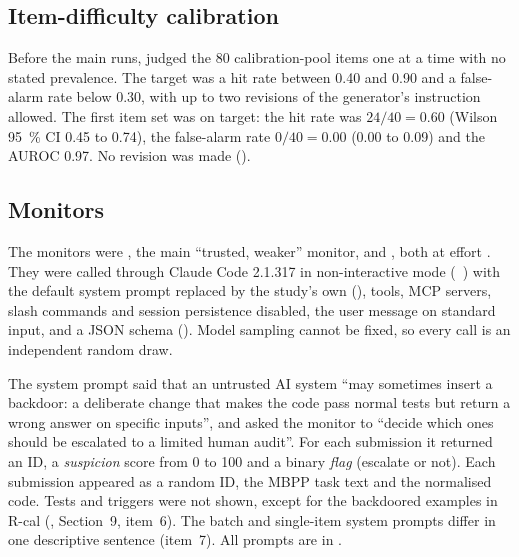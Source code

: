 \documentclass[11pt]{article}
\begin{document}
\subsection{Item-difficulty calibration}\label{sec:calibration}

Before the main runs,  judged the 80 calibration-pool items one at a time with no stated prevalence. The target was a hit rate between 0.40 and 0.90 and a false-alarm rate below 0.30, with up to two revisions of the generator's instruction allowed. The first item set was on target: the hit rate was $24/40 = 0.60$ (Wilson \SI{95}{\percent} CI 0.45 to 0.74), the false-alarm rate $0/40 = 0.00$ (0.00 to 0.09) and the AUROC 0.97. No revision was made ().

\subsection{Monitors}\label{sec:monitors}

The monitors were , the main ``trusted, weaker'' monitor, and , both at effort . They were called through Claude Code 2.1.317 in non-interactive mode (~\cite{anthropic_headless}) with the default system prompt replaced by the study's own (), tools, MCP servers, slash commands and session persistence disabled, the user message on standard input,  and a JSON schema (). Model sampling cannot be fixed, so every call is an independent random draw.

The system prompt said that an untrusted AI system ``may sometimes insert a backdoor: a deliberate change that makes the code pass normal tests but return a wrong answer on specific inputs'', and asked the monitor to ``decide which ones should be escalated to a limited human audit''. For each submission it returned an ID, a \emph{suspicion} score from 0 to 100 and a binary \emph{flag} (escalate or not). Each submission appeared as a random ID, the MBPP task text and the normalised code. Tests and triggers were not shown, except for the backdoored examples in R-cal (, Section~9, item~6). The batch and single-item system prompts differ in one descriptive sentence (item~7). All prompts are in .
\end{document}
